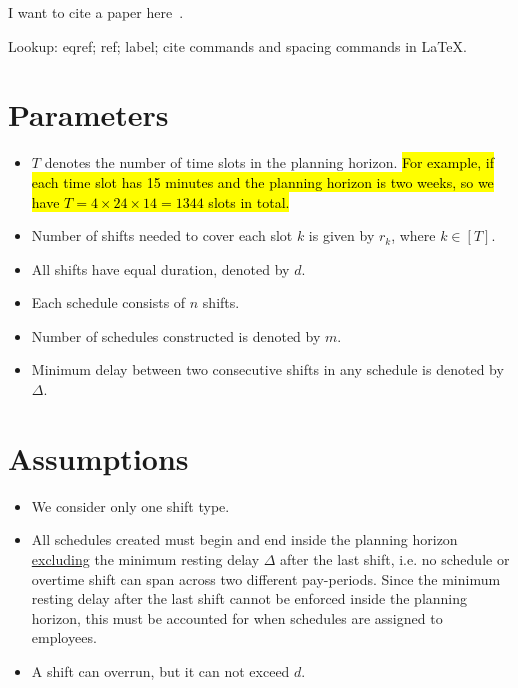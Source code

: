 \documentclass[11pt]{article}
\begin{document}
	 
	 I want to cite a paper here~\cite{BBFNFMP2019closecentralclq}.
	 
	 Lookup: eqref; ref; label; cite commands and spacing commands in \LaTeX.

\section{Parameters}
\begin{itemize}
\item $T$ denotes the number of time slots in the planning horizon. \hl{For example, if each time slot has 15 minutes and the planning horizon is two weeks, so we have $T = 4\times 24 \times 14 = 1344$ slots in total.}

\item Number of shifts needed to cover each slot $k$ is given by $r_k$, where $k \in [T]$.

\item All shifts have equal duration, denoted by $d$.

\item Each schedule consists of $n$ shifts.

\item Number of schedules constructed is denoted by $m$.

\item Minimum delay between two consecutive shifts in any schedule is denoted by $\Delta$. 

\end{itemize}

\section{Assumptions} 
\begin{itemize}

\item We consider only one shift type.

\item All schedules created must begin and end inside the planning horizon \underline{excluding} the minimum resting delay $\Delta$ after the last shift, i.e. no schedule or overtime shift can span across two different pay-periods. Since the minimum resting delay after the last shift cannot be enforced inside the planning horizon, this must be accounted for when schedules are assigned to employees. 

\item A shift can overrun, but it can not exceed $d$.

\end{itemize}
\end{document}
